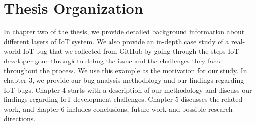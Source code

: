 \section{Thesis Organization }
In chapter two of the thesis, we provide detailed background information about different layers of IoT system. We also provide an in-depth case study of a real-world IoT bug that we collected from GitHub by going through the steps IoT developer gone through to debug the issue and the challenges they faced throughout the process. We use this example as the motivation for our study. In chapter 3, we provide our bug analysis methodology and our findings regarding IoT bugs. Chapter 4 starts with a description of our methodology and discuss our findings regarding IoT development challenges. Chapter 5 discusses the related work, and chapter 6 includes conclusions, future work and possible research directions.

\endinput

